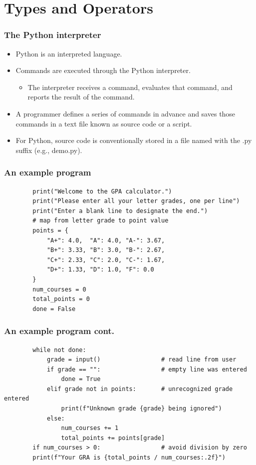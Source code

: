 \section{Types and Operators}

\begin{frame}
    \frametitle{The Python interpreter}

    \begin{itemize}
        \item Python is an interpreted language.
        \item Commands are executed through the Python interpreter.
              \begin{itemize}
                  \item The interpreter receives a command, evaluates that command, and reports the result of the command.
              \end{itemize}
        \item A programmer defines a series of commands in advance and saves those commands in a text file known as source code or a script.
        \item For Python, source code is conventionally stored in a file named with the .py suffix (e.g., demo.py).

    \end{itemize}

\end{frame}

\begin{frame}[fragile]
    \frametitle{An example program}

    \begin{verbatim}            
        print("Welcome to the GPA calculator.")
        print("Please enter all your letter grades, one per line")
        print("Enter a blank line to designate the end.")
        # map from letter grade to point value
        points = {
            "A+": 4.0,  "A": 4.0, "A-": 3.67, 
            "B+": 3.33, "B": 3.0, "B-": 2.67, 
            "C+": 2.33, "C": 2.0, "C-": 1.67, 
            "D+": 1.33, "D": 1.0, "F": 0.0
        }
        num_courses = 0
        total_points = 0
        done = False
    \end{verbatim}
\end{frame}

\begin{frame}[fragile]
    \frametitle{An example program cont.}

    \begin{verbatim}
        while not done:
            grade = input()                 # read line from user
            if grade == "":                 # empty line was entered
                done = True
            elif grade not in points:       # unrecognized grade entered
                print(f"Unknown grade {grade} being ignored")
            else:
                num_courses += 1
                total_points += points[grade]
        if num_courses > 0:                 # avoid division by zero
        print(f"Your GRA is {total_points / num_courses:.2f}")
    \end{verbatim}

\end{frame}

